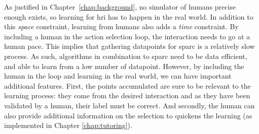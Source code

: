 As justified in Chapter~\ref{chap:background}, no simulator of humans precise enough exists, so learning for \gls{hri} has to happen in the real world. In addition to this \emph{space} constraint, learning from humans also adds a \emph{time} constraint. By including a human in the action selection loop, the interaction needs to go at a human pace. This implies that gathering datapoints for \gls{sparc} is a relatively slow process. As such, algorithms in combination to \gls{sparc} need to be data efficient, and able to learn from a low number of datapoint. However, by including the human in the loop and learning in the real world, we can have important additional features. First, the points accumulated are sure to be relevant to the learning process: they come from the desired interaction and as they have been validated by a human, their label must be correct. And secondly, the human can also provide additional information on the selection to quickens the learning (as implemented in Chapter \ref{chap:tutoring}).

